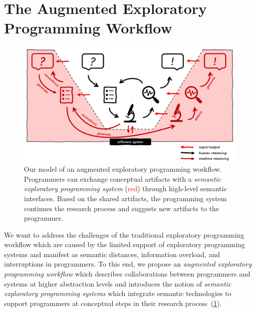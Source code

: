 
\section{The Augmented Exploratory Programming Workflow}
\label{sec:approach/workflow}

\begin{figure}
	\centering
	\includegraphics[width=\textwidth]{01_workflow/workflow.png}
	\caption[Our model of an augmented exploratory programming workflow.]{
		Our model of an augmented exploratory programming workflow.
		Programmers can exchange conceptual artifacts with a \emph{semantic exploratory programming system} (\textcolor{red}{red}) through high-level semantic interfaces.
		Based on the shared artifacts, the programming system continues the research process and suggests new artifacts to the programmer.
	}
	\label{fig:approach/workflow/workflow}
\end{figure}

We want to address the challenges of the traditional exploratory programming workflow which are caused by the limited support of exploratory programming systems and manifest as semantic distances, information overload, and interruptions in programmers.
To this end, we propose an \emph{augmented exploratory programming workflow} which describes collaborations between programmers and systems at higher abstraction levels and introduces the notion of \emph{semantic exploratory programming systems} which integrate semantic technologies to support programmers at conceptual steps in their research process~(\cref{fig:approach/workflow/workflow}).

